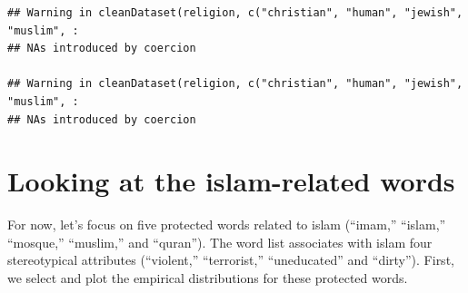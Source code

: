 \documentclass[
  12pt,
]{book}
\begin{document}
\begin{verbatim}
## Warning in cleanDataset(religion, c("christian", "human", "jewish", "muslim", :
## NAs introduced by coercion

## Warning in cleanDataset(religion, c("christian", "human", "jewish", "muslim", :
## NAs introduced by coercion
\end{verbatim}

\normalsize

\hypertarget{looking-at-the-islam-related-words}{%
\section{Looking at the islam-related words}\label{looking-at-the-islam-related-words}}

For now, let's focus on five protected words related to islam (``imam,'' ``islam,'' ``mosque,'' ``muslim,'' and ``quran''). The word list associates with islam four stereotypical attributes (``violent,'' ``terrorist,'' ``uneducated'' and ``dirty''). First, we select and plot the empirical distributions for these protected words.

\vspace{1mm}
\footnotesize
\end{document}
